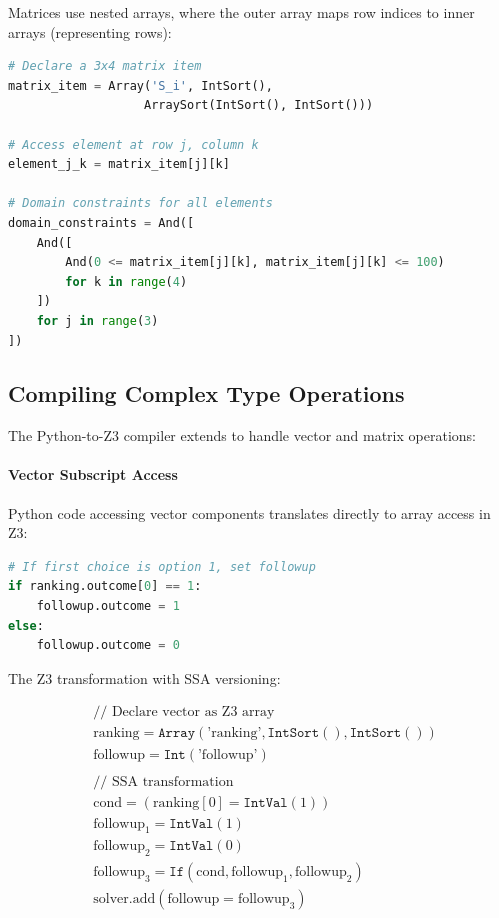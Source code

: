 Matrices use nested arrays, where the outer array maps row indices to inner arrays (representing rows):

\begin{lstlisting}[language=Python, caption={Matrix item representation in Z3}]
# Declare a 3x4 matrix item
matrix_item = Array('S_i', IntSort(),
                   ArraySort(IntSort(), IntSort()))

# Access element at row j, column k
element_j_k = matrix_item[j][k]

# Domain constraints for all elements
domain_constraints = And([
    And([
        And(0 <= matrix_item[j][k], matrix_item[j][k] <= 100)
        for k in range(4)
    ])
    for j in range(3)
])
\end{lstlisting}

\subsection{Compiling Complex Type Operations}

The Python-to-Z3 compiler extends to handle vector and matrix operations:

\paragraph{Vector Subscript Access}

Python code accessing vector components translates directly to array access in Z3:

\begin{lstlisting}[language=Python, numbers=none, caption={Python code with vector access}]
# If first choice is option 1, set followup
if ranking.outcome[0] == 1:
    followup.outcome = 1
else:
    followup.outcome = 0
\end{lstlisting}

The Z3 transformation with SSA versioning:

\begin{align*}
& \text{// Declare vector as Z3 array} \\
& \text{ranking} = \texttt{Array}(\text{'ranking'}, \texttt{IntSort}(), \texttt{IntSort}()) \\
& \text{followup} = \texttt{Int}(\text{'followup'}) \\
\\
& \text{// SSA transformation} \\
& \text{cond} = (\text{ranking}[0] = \texttt{IntVal}(1)) \\
& \text{followup}_1 = \texttt{IntVal}(1) \\
& \text{followup}_2 = \texttt{IntVal}(0) \\
& \text{followup}_3 = \texttt{If}(\text{cond}, \text{followup}_1, \text{followup}_2) \\
& \text{solver.add}(\text{followup} = \text{followup}_3)
\end{align*}

